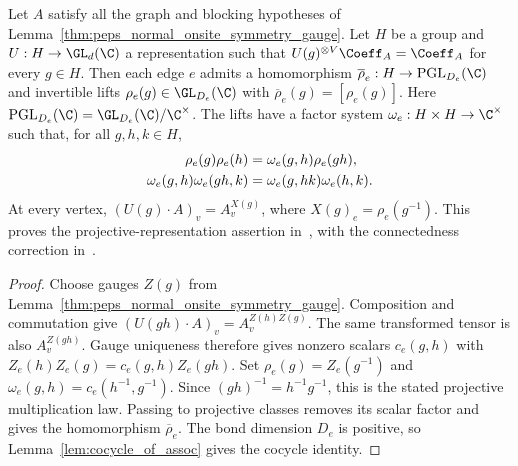 \begin{lemma}%
    \label{thm:peps_normal_virtual_representation}
    \leanok

    Let $A$ satisfy all the graph and blocking hypotheses of
    Lemma~\ref{thm:peps_normal_onsite_symmetry_gauge}. Let $H$ be a group
    and $U:H\to\GL_d(\C)$ a representation such that
    $U(g)^{\otimes V}\Coeff_A=\Coeff_A$ for every $g\in H$.
    Then each edge $e$ admits a homomorphism
    $\overline\rho_e:H\to\operatorname{PGL}_{D_e}(\C)$ and invertible lifts
    $\rho_e(g)\in\GL_{D_e}(\C)$ with
    $\overline\rho_e(g)=[\rho_e(g)]$. Here
    $\operatorname{PGL}_{D_e}(\C)=\GL_{D_e}(\C)/\C^\times$.
    The lifts have a factor system $\omega_e:H\times H\to\C^\times$
    such that, for all $g,h,k\in H$,
    \begin{align}
        \rho_e(g)\rho_e(h)          & =\omega_e(g,h)\rho_e(gh),\notag     \\
        \omega_e(g,h)\omega_e(gh,k) & =\omega_e(g,hk)\omega_e(h,k).\notag
    \end{align}
    At every vertex, $(U(g)\cdot A)_v=A^{X(g)}_v$, where
    $X(g)_e=\rho_e(g^{-1})$.
    This proves the projective-representation assertion
    in~\cite[Applications, line~1713]{Molnar2018NormalPEPS}, with the
    connectedness correction in~\cite{gap:peps_gaugeConsistency_connectivity_gap}.
\end{lemma}
\begin{proof}\leanok
    Choose gauges $Z(g)$ from
    Lemma~\ref{thm:peps_normal_onsite_symmetry_gauge}.
    Composition and commutation give
    $(U(gh)\cdot A)_v=A^{Z(h)Z(g)}_v$.
    The same transformed tensor is also $A^{Z(gh)}_v$.
    Gauge uniqueness therefore gives nonzero scalars $c_e(g,h)$ with
    $Z_e(h)Z_e(g)=c_e(g,h)Z_e(gh)$.
    Set $\rho_e(g)=Z_e(g^{-1})$ and
    $\omega_e(g,h)=c_e(h^{-1},g^{-1})$.
    Since $(gh)^{-1}=h^{-1}g^{-1}$, this is the stated projective
    multiplication law. Passing to projective classes removes its scalar
    factor and gives the homomorphism $\overline\rho_e$.
    The bond dimension $D_e$ is positive, so
    Lemma~\ref{lem:cocycle_of_assoc} gives the cocycle identity.
\end{proof}
